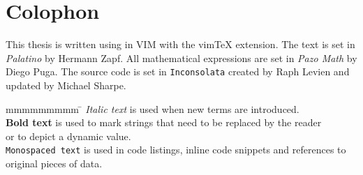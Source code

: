 
\vspace*{\fill}

\section*{Colophon}

This thesis is written using \LaTeXe{} in VIM with the vim\TeX{} extension. The
text is set in \textit{Palatino} by Hermann Zapf. All mathematical expressions
are set in \textit{Pazo Math} by Diego Puga. The source code is set in
\texttt{Inconsolata} created by Raph Levien and updated by Michael
Sharpe.

\begin{tabbing}
  mmmmmmmmm     \= \kill
  \textit{Italic text}     \> is used when new terms are introduced.\\
  \textbf{Bold text}       \> is used to mark strings that need to be replaced by the reader\\
                           \> or to depict a dynamic value.\\
  \texttt{Monospaced text} \> is used in code listings, inline code snippets and references to\\
                           \> original pieces of data.
\end{tabbing}

